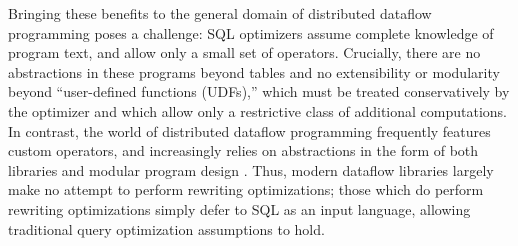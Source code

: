 Bringing these benefits to the general domain of distributed dataflow programming poses a challenge: SQL optimizers assume complete knowledge of program text, and allow only a small set of operators.  Crucially, there are no abstractions in these programs beyond tables and no extensibility or modularity beyond ``user-defined functions (UDFs),'' which must be treated conservatively by the optimizer and which allow only a restrictive class of additional computations.  In contrast, the world of distributed dataflow programming frequently features custom operators, and increasingly relies on abstractions in the form of both libraries and modular program design \cite{hope-this-is-true!}. Thus, modern dataflow libraries largely make no attempt to perform rewriting optimizations; those which do perform rewriting optimizations simply defer to SQL as an input language, allowing traditional query optimization assumptions to hold. 





\endinput
